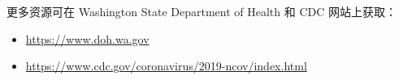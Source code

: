 \documentclass[10pt]{article}
\begin{document}
更多资源可在 Washington State Department of Health 和 CDC 网站上获取：

\begin{itemize}
\item

  \url{https://www.doh.wa.gov}

\item

  \url{https://www.cdc.gov/coronavirus/2019-ncov/index.html}

\end{itemize}
\end{document}

